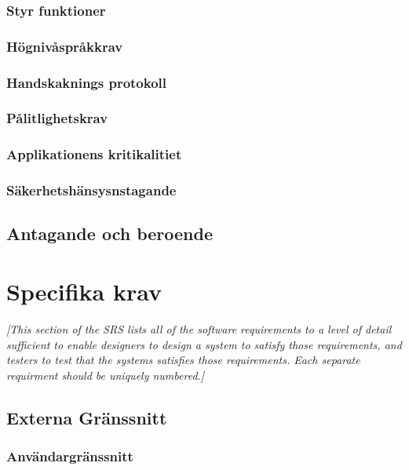 \documentclass{article}
\begin{document}
\begin{enumerate}
\subsubsection{Styr funktioner}
\label{subsec:Styr funktioner}
\subsubsection{Högnivåspråkkrav}
\label{subsec:Hognivasprakkrav}
\subsubsection{Handskaknings protokoll}
\label{subsec:Handskaknings protokoll}
\subsubsection{Pålitlighetskrav}
\label{subsec:Palitlighetskrav}
\subsubsection{Applikationens kritikalitiet}
\label{subsection:Applikationens kritikalitiet}
\subsubsection{Säkerhetshänsysnstagande}
\label{subsec:Sakerhetshansysnstagande}

\subsection{Antagande och beroende}
\label{subsec:Antagande och beroende}

\section{Specifika krav}
\label{sec:Specifika krav}
\emph{[This section of the \ac{SRS} lists all of the software requirements to
  a level of detail sufficient to enable designers to design a system to
  satisfy those requirements, and testers to test that the systems satisfies
  those requirements. Each separate requirment should be uniquely numbered.]}

\subsection{Externa Gränssnitt}
\label{subsec:Externa Granssnitt}
\subsubsection{Användargränssnitt}
\label{subsec:EG-Anvandargranssnitt}

\end{enumerate}
\end{document}
